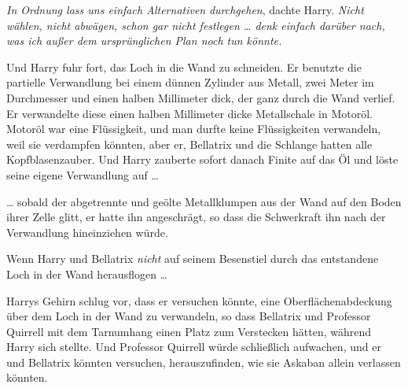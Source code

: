 \emph{In Ordnung lass uns einfach Alternativen} \emph{durchgehen}, dachte Harry. \emph{Nicht wählen, nicht abwägen, schon gar nicht festlegen … denk einfach darüber nach, was ich außer dem ursprünglichen Plan noch tun könnte.}

Und Harry fuhr fort, das Loch in die Wand zu schneiden. Er benutzte die partielle Verwandlung bei einem dünnen Zylinder aus Metall, zwei Meter im Durchmesser und einen halben Millimeter dick, der ganz durch die Wand verlief. Er verwandelte diese einen halben Millimeter dicke Metallschale in Motoröl. Motoröl war eine Flüssigkeit, und man durfte keine Flüssigkeiten verwandeln, weil sie verdampfen könnten, aber er, Bellatrix und die Schlange hatten alle Kopfblasenzauber. Und Harry zauberte sofort danach Finite auf das Öl und löste seine eigene Verwandlung auf …

… sobald der abgetrennte und geölte Metallklumpen aus der Wand auf den Boden ihrer Zelle glitt, er hatte ihn angeschrägt, so dass die Schwerkraft ihn nach der Verwandlung hineinziehen würde.

Wenn Harry und Bellatrix \emph{nicht} auf seinem Besenstiel durch das entstandene Loch in der Wand herausflogen …

Harrys Gehirn schlug vor, dass er versuchen könnte, eine Oberflächenabdeckung über dem Loch in der Wand zu verwandeln, so dass Bellatrix und Professor Quirrell mit dem Tarnumhang einen Platz zum Verstecken hätten, während Harry sich stellte. Und Professor Quirrell würde schließlich aufwachen, und er und Bellatrix könnten versuchen, herauszufinden, wie sie Askaban allein verlassen könnten.

